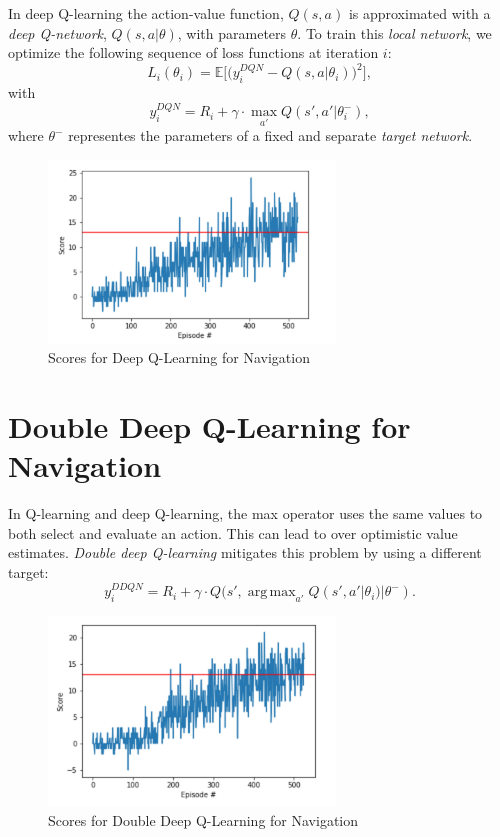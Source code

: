 \documentclass[tog]{acmsiggraph}
\begin{document}
In deep Q-learning the action-value function, $Q(s,a)$ is approximated with a {\em deep Q-network},
$Q(s,a|\theta)$, with parameters $\theta$.  To train this {\em local network}, we optimize the following sequence
of loss functions at iteration $i$:
$$L_i(\theta_i) = \mathbb{E}\big[\big(y_i^{DQN}-Q(s,a|\theta_i)\big)^2\big],$$
with 
$$ y_i^{DQN}=R_i+\gamma\cdot\max_{a'}Q(s',a'|\theta^-_i),$$
where $\theta^-$ representes the parameters of a fixed and separate {\em target network}.

\FloatBarrier
\begin{figure}[h]
	\centering
	\includegraphics[width=3.0in]{images/dqn-scores}
	\caption{Scores for Deep Q-Learning for Navigation}
	\label{fig:ferrari}
\end{figure}
\FloatBarrier

\section{ Double Deep Q-Learning for Navigation}

In Q-learning and deep Q-learning, the max operator uses the same values to both select and evaluate an action. 
This can lead to over optimistic value estimates.  {\em Double deep Q-learning} mitigates this problem by using a different target:
$$ y_i^{DDQN}=R_i+\gamma\cdot Q(s',  \operatorname{arg\,max}_{a'} Q(s',a'|\theta_i)|\theta^-).$$

\begin{figure}[h]
	\centering
	\includegraphics[width=3.0in]{images/double-dqn-scores}
	\caption{Scores for Double Deep Q-Learning for Navigation}
	\label{fig:ferrari}
\end{figure}
\end{document}
